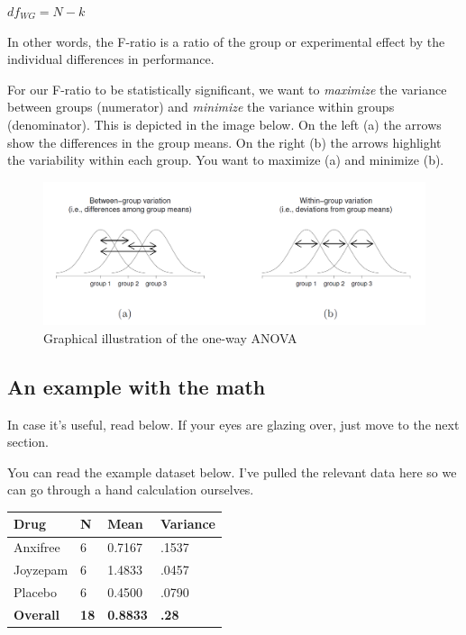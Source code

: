 \documentclass[
]{book}
\begin{document}
\(df_{WG} = N - k\)

In other words, the F-ratio is a ratio of the group or experimental effect by the individual differences in performance.

For our F-ratio to be statistically significant, we want to \emph{maximize} the variance between groups (numerator) and \emph{minimize} the variance within groups (denominator). This is depicted in the image below. On the left (a) the arrows show the differences in the group means. On the right (b) the arrows highlight the variability within each group. You want to maximize (a) and minimize (b).

\begin{figure}

{\centering \includegraphics[width=0.8\linewidth]{images/04_one-way-anova/anova graphic} 

}

\caption{Graphical illustration of the one-way ANOVA}\label{fig:unnamed-chunk-1}
\end{figure}

\hypertarget{an-example-with-the-math}{%
\subsection{An example with the math}\label{an-example-with-the-math}}

In case it's useful, read below. If your eyes are glazing over, just move to the next section.

You can read the example dataset below. I've pulled the relevant data here so we can go through a hand calculation ourselves.

\begin{longtable}[]{@{}llll@{}}
\toprule
Drug & N & Mean & Variance\tabularnewline
\midrule
\endhead
Anxifree & 6 & 0.7167 & .1537\tabularnewline
Joyzepam & 6 & 1.4833 & .0457\tabularnewline
Placebo & 6 & 0.4500 & .0790\tabularnewline
\textbf{Overall} & \textbf{18} & \textbf{0.8833} & \textbf{.28}\tabularnewline
\bottomrule
\end{longtable}
\end{document}
